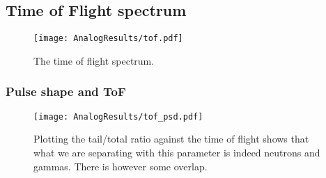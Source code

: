 \documentclass[main.tex]{subfiles}
\begin{document}
\subsection{Time of Flight spectrum}
\begin{figure}[ht]
    \centering
        \texttt{[image: AnalogResults/tof.pdf]}
        \caption{The time of flight spectrum.}
    \label{fig:A_TOF}
\end{figure}

\subsubsection{Pulse shape and ToF}
\begin{figure}[ht]
    \centering
        \texttt{[image: AnalogResults/tof\_psd.pdf]}
        \caption{Plotting the tail/total ratio against the time of flight shows that what we are separating with this parameter is indeed neutrons and gammas. There is however some overlap.}
    \label{fig:tof_ps_a} 
\end{figure}
\end{document}
